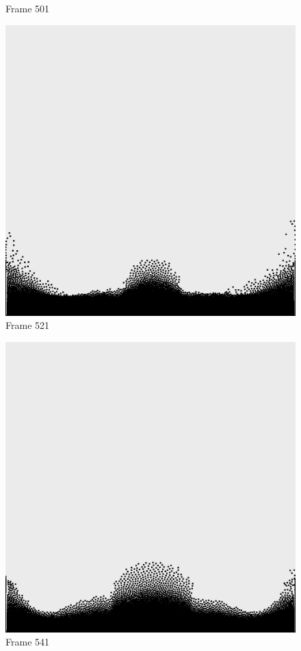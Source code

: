 \documentclass[a4paper, 12pt, oneside]{book}
\begin{document}
\begin{figure}[!ht]
\begin{center}
            Frame 501
        \end{center}
    \endminipage
    \hfill
        \begin{center}
            \includegraphics[width=\linewidth]{images/test_case_1/521.png}
            Frame 521
        \end{center}
    \endminipage
    \hfill
        \begin{center}
            \includegraphics[width=\linewidth]{images/test_case_1/541.png}
            Frame 541
        \end{center}
    \endminipage
    \hfill


\end{figure}
\end{document}
